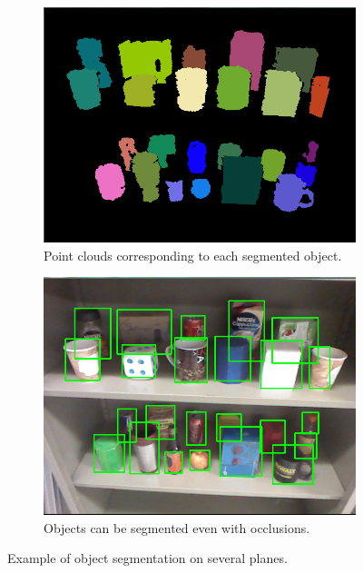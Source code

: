 \documentclass{llncs}
\begin{document}
\begin{figure}
	\centering
	\begin{subfigure}{0.49\textwidth}
		\includegraphics[width=\textwidth]{Figures/objetos2.png} 
		\caption{ Point clouds corresponding to each segmented object.}
		\label{fig:objReco1}
	\end{subfigure}
	\begin{subfigure}{0.49\textwidth}
		\includegraphics[width=\textwidth]{Figures/objetos1.png}
		\caption{Objects can be segmented even with occlusions.}
		\label{fig:objReco2}
	\end{subfigure}
	\caption{Example of object segmentation on several planes.}
	\label{fig:objReco}
\end{figure}
\end{document}
